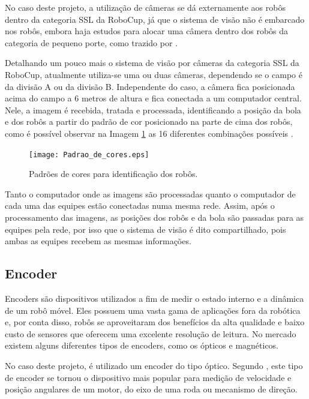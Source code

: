 \documentclass[acronym, symbols, table, deposito]{fei}
\begin{document}
				No caso deste projeto, a utilização de câmeras se dá externamente aos robôs dentro da categoria SSL da RoboCup, já que o sistema de visão não é embarcado nos robôs, embora haja estudos para alocar uma câmera dentro dos robôs da categoria de pequeno porte, como trazido por \textcite{melo2022embedded}.
				
				Detalhando um pouco mais o sistema de visão por câmeras da categoria SSL da RoboCup, atualmente utiliza-se uma ou duas câmeras, dependendo se o campo é da divisão A ou da divisão B. Independente do caso, a câmera fica posicionada acima do campo a 6 metros de altura e fica conectada a um computador central. Nele, a imagem é recebida, tratada e processada, identificando a posição da bola e dos robôs a partir do padrão de cor posicionado na parte de cima dos robôs, como é possível observar na Imagem \ref{fig:color_patterns} as 16 diferentes combinações possíveis \cite{10.1007/978-3-642-11876-0_37}.
				
				\begin{figure}[!htb]
					\centering
					\caption{Padrões de cores para identificação dos robôs.} 
					\texttt{[image: Padrao\_de\_cores.eps]}
					\label{fig:color_patterns}
				\end{figure}
			
				Tanto o computador onde as imagens são processadas quanto o computador de cada uma das equipes estão conectadas numa mesma rede. Assim, após o processamento das imagens, as posições dos robôs e da bola são passadas para as equipes pela rede, por isso que o sistema de visão é dito compartilhado, pois ambas as equipes recebem as mesmas informações.
			
			\subsection{Encoder}\label{sec:sensores_encoders}
				
				Encoders são dispositivos utilizados a fim de medir o estado interno e a dinâmica de um robô móvel. Eles possuem uma vasta gama de aplicações fora da robótica e, por conta disso, robôs se aproveitaram dos benefícios da alta qualidade e baixo custo de sensores que oferecem uma excelente resolução de leitura. No mercado existem alguns diferentes tipos de encoders, como os ópticos e magnéticos. 
				
				No caso deste projeto, é utilizado um encoder do tipo óptico. Segundo \textcite{siegwart2011introduction}, este tipo de encoder se tornou o dispositivo mais popular para medição de velocidade e posição angulares de um motor, do eixo de uma roda ou mecanismo de direção.
				
\end{document}
